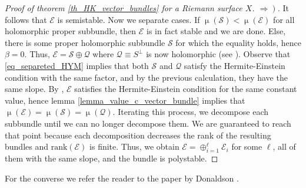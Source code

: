 \begin{proof}[\textit{Proof of theorem} \ref{th_HK_vector_bundles} \textit{for a Riemann surface} \(X\). \(\left.\Rightarrow\right)\)]
    It follows that \(\mathcal{E}\) is semistable. Now we separate cases. If \(\upmu(\mathcal{S})<\upmu(\mathcal{E})\) for all holomorphic proper subbundle, then \(\mathcal{E}\) is in fact stable and we are done. Else, there is some proper holomorphic subbundle \(\mathcal{S}\) for which the equality holds, hence \(\beta=0\). Thus, \(\mathcal{E=S \oplus Q}\) where \(\mathcal{Q}\equiv S^\perp\) is now holomorphic (see \parencite[Prop. 1.6.14]{kobayashi_complex_vector_bundles}). Observe that \eqref{eq_separeted_HYM} implies that both \(\mathcal{S}\) and \(\mathcal{Q}\) satisfy the Hermite-Einstein condition with the same factor, and by the previous calculation, they have the same slope. By \parencite[Prop. 4.1.4]{kobayashi_complex_vector_bundles}, \(\mathcal{E}\) satisfies the Hermite-Einstein condition for the same constant value, hence lemma \ref{lemma_value_c_vector_bundle} implies that \(\upmu(\mathcal{E})=\upmu(\mathcal{S})=\upmu(\mathcal{Q})\). Iterating this process, we decompose each subbundle until we can no longer decompose them. We are guaranteed to reach that point because each decomposition decreases the rank of the resulting bundles and \(\mathrm{rank(\mathcal{E})}\) is finite. Thus, we obtain \(\mathcal{E}=\oplus_{i=1}^\ell \mathcal{E}_i\) for some \(\ell\), all of them with the same slope, and the bundle is polystable.
\end{proof}

For the converse we refer the reader to the paper by Donaldson \parencite{DonaldsonNS83}.


